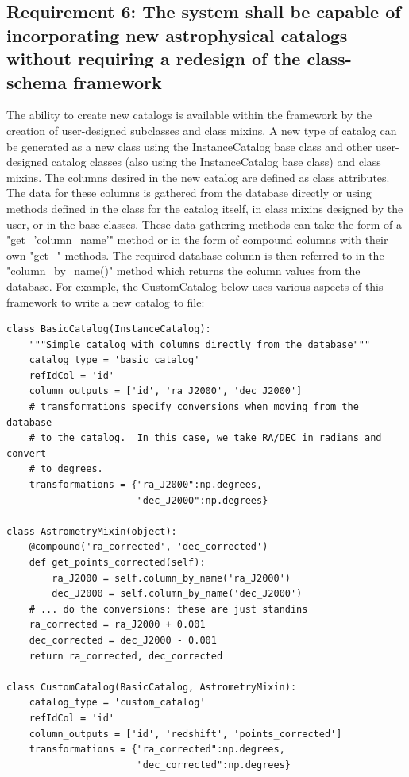 \documentclass[]{article}
\begin{document}
{\subsection{Requirement 6: The system shall be capable of incorporating new astrophysical catalogs without requiring
a redesign of the class-schema framework}
The ability to create new catalogs is available within the framework by the creation of user-designed subclasses and class mixins. A new type of catalog can be generated as a new class using the InstanceCatalog base class and other user-designed catalog classes (also using the InstanceCatalog base class) and class mixins. The columns desired in the new catalog are defined as class attributes. The data for these columns is gathered from the database directly or using methods defined in the class
for the catalog itself, in class mixins designed by the user, or in the base classes. These data gathering methods can take the form of a "get\_'column\_name'" method or in the form of compound columns with their own "get\_" methods. The required database column is then referred to in the "column\_by\_name()" method which returns the column values from the database. For example, the CustomCatalog below uses various aspects of this framework to write a new catalog to file:

\begin{verbatim}
class BasicCatalog(InstanceCatalog):
    """Simple catalog with columns directly from the database"""
    catalog_type = 'basic_catalog'
    refIdCol = 'id'
    column_outputs = ['id', 'ra_J2000', 'dec_J2000']
    # transformations specify conversions when moving from the database
    # to the catalog.  In this case, we take RA/DEC in radians and convert
    # to degrees.
    transformations = {"ra_J2000":np.degrees,
                       "dec_J2000":np.degrees}

class AstrometryMixin(object):
    @compound('ra_corrected', 'dec_corrected')
    def get_points_corrected(self):
        ra_J2000 = self.column_by_name('ra_J2000')
        dec_J2000 = self.column_by_name('dec_J2000')
    # ... do the conversions: these are just standins
    ra_corrected = ra_J2000 + 0.001
    dec_corrected = dec_J2000 - 0.001
    return ra_corrected, dec_corrected

class CustomCatalog(BasicCatalog, AstrometryMixin):
    catalog_type = 'custom_catalog'
    refIdCol = 'id'
    column_outputs = ['id', 'redshift', 'points_corrected']
    transformations = {"ra_corrected":np.degrees,
                       "dec_corrected":np.degrees}


\end{verbatim}}
\end{document}
